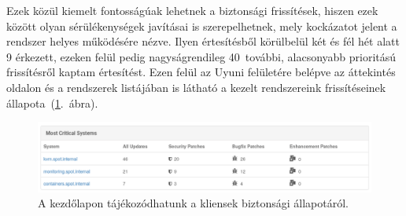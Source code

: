 Ezek közül kiemelt fontosságúak lehetnek a biztonsági frissítések, hiszen ezek között olyan sérülékenységek javításai is szerepelhetnek, mely kockázatot jelent a rendszer helyes működésére nézve. Ilyen értesítésből körülbelül két és fél hét alatt 9 érkezett, ezeken felül pedig nagyságrendileg 40~további, alacsonyabb prioritású frissítésről kaptam értesítést. Ezen felül az Uyuni felületére belépve az áttekintés oldalon és a rendszerek listájában is látható a kezelt rendszereink frissítéseinek állapota~(\ref{fig:uyuni-security-status}.~ábra).

\begin{figure}[ht]
	\centering
	\includegraphics[width=15cm]{figures/uyuni-security-status.png}
	\caption{A kezdőlapon tájékozódhatunk a kliensek biztonsági állapotáról.}
	\label{fig:uyuni-security-status}
\end{figure}